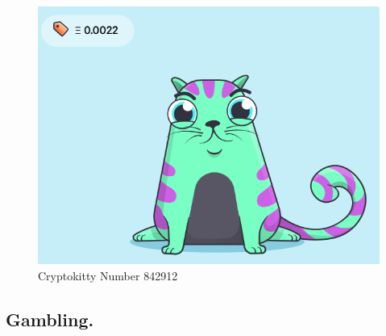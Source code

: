 \begin{figure}[h]
\centering
\includegraphics[width=0.3\linewidth]{figures/cryptokittie842912.png}
\caption{ Cryptokitty Number 842912 \label{fig:cryptokittie}}
\end{figure}


\subsection{Gambling.} 

